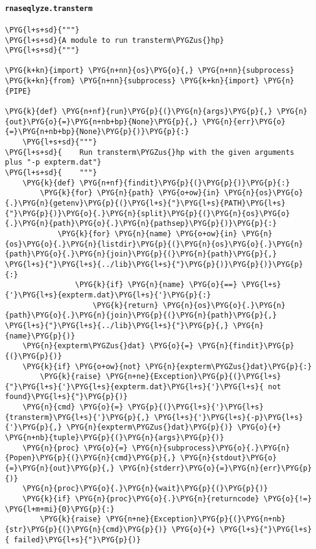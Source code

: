 \paragraph{\texttt{rnaseqlyze.transterm}}
\label{index-pdf4:rnaseqlyze-transterm}
\begin{Verbatim}[commandchars=\\\{\}]
\PYG{l+s+sd}{"""}
\PYG{l+s+sd}{A module to run transterm\PYGZus{}hp}
\PYG{l+s+sd}{"""}

\PYG{k+kn}{import} \PYG{n+nn}{os}\PYG{o}{,} \PYG{n+nn}{subprocess}
\PYG{k+kn}{from} \PYG{n+nn}{subprocess} \PYG{k+kn}{import} \PYG{n}{PIPE}

\PYG{k}{def} \PYG{n+nf}{run}\PYG{p}{(}\PYG{n}{args}\PYG{p}{,} \PYG{n}{out}\PYG{o}{=}\PYG{n+nb+bp}{None}\PYG{p}{,} \PYG{n}{err}\PYG{o}{=}\PYG{n+nb+bp}{None}\PYG{p}{)}\PYG{p}{:}
    \PYG{l+s+sd}{"""}
\PYG{l+s+sd}{    Run transterm\PYGZus{}hp with the given arguments plus "-p expterm.dat"}
\PYG{l+s+sd}{    """}
    \PYG{k}{def} \PYG{n+nf}{findit}\PYG{p}{(}\PYG{p}{)}\PYG{p}{:}
        \PYG{k}{for} \PYG{n}{path} \PYG{o+ow}{in} \PYG{n}{os}\PYG{o}{.}\PYG{n}{getenv}\PYG{p}{(}\PYG{l+s}{"}\PYG{l+s}{PATH}\PYG{l+s}{"}\PYG{p}{)}\PYG{o}{.}\PYG{n}{split}\PYG{p}{(}\PYG{n}{os}\PYG{o}{.}\PYG{n}{path}\PYG{o}{.}\PYG{n}{pathsep}\PYG{p}{)}\PYG{p}{:}
            \PYG{k}{for} \PYG{n}{name} \PYG{o+ow}{in} \PYG{n}{os}\PYG{o}{.}\PYG{n}{listdir}\PYG{p}{(}\PYG{n}{os}\PYG{o}{.}\PYG{n}{path}\PYG{o}{.}\PYG{n}{join}\PYG{p}{(}\PYG{n}{path}\PYG{p}{,} \PYG{l+s}{"}\PYG{l+s}{../lib}\PYG{l+s}{"}\PYG{p}{)}\PYG{p}{)}\PYG{p}{:}
                \PYG{k}{if} \PYG{n}{name} \PYG{o}{==} \PYG{l+s}{'}\PYG{l+s}{expterm.dat}\PYG{l+s}{'}\PYG{p}{:}
                    \PYG{k}{return} \PYG{n}{os}\PYG{o}{.}\PYG{n}{path}\PYG{o}{.}\PYG{n}{join}\PYG{p}{(}\PYG{n}{path}\PYG{p}{,} \PYG{l+s}{"}\PYG{l+s}{../lib}\PYG{l+s}{"}\PYG{p}{,} \PYG{n}{name}\PYG{p}{)}
    \PYG{n}{expterm\PYGZus{}dat} \PYG{o}{=} \PYG{n}{findit}\PYG{p}{(}\PYG{p}{)}
    \PYG{k}{if} \PYG{o+ow}{not} \PYG{n}{expterm\PYGZus{}dat}\PYG{p}{:}
        \PYG{k}{raise} \PYG{n+ne}{Exception}\PYG{p}{(}\PYG{l+s}{"}\PYG{l+s}{'}\PYG{l+s}{expterm.dat}\PYG{l+s}{'}\PYG{l+s}{ not found}\PYG{l+s}{"}\PYG{p}{)}
    \PYG{n}{cmd} \PYG{o}{=} \PYG{p}{(}\PYG{l+s}{'}\PYG{l+s}{transterm}\PYG{l+s}{'}\PYG{p}{,} \PYG{l+s}{'}\PYG{l+s}{-p}\PYG{l+s}{'}\PYG{p}{,} \PYG{n}{expterm\PYGZus{}dat}\PYG{p}{)} \PYG{o}{+} \PYG{n+nb}{tuple}\PYG{p}{(}\PYG{n}{args}\PYG{p}{)}
    \PYG{n}{proc} \PYG{o}{=} \PYG{n}{subprocess}\PYG{o}{.}\PYG{n}{Popen}\PYG{p}{(}\PYG{n}{cmd}\PYG{p}{,} \PYG{n}{stdout}\PYG{o}{=}\PYG{n}{out}\PYG{p}{,} \PYG{n}{stderr}\PYG{o}{=}\PYG{n}{err}\PYG{p}{)}
    \PYG{n}{proc}\PYG{o}{.}\PYG{n}{wait}\PYG{p}{(}\PYG{p}{)}
    \PYG{k}{if} \PYG{n}{proc}\PYG{o}{.}\PYG{n}{returncode} \PYG{o}{!=} \PYG{l+m+mi}{0}\PYG{p}{:}
        \PYG{k}{raise} \PYG{n+ne}{Exception}\PYG{p}{(}\PYG{n+nb}{str}\PYG{p}{(}\PYG{n}{cmd}\PYG{p}{)} \PYG{o}{+} \PYG{l+s}{"}\PYG{l+s}{ failed}\PYG{l+s}{"}\PYG{p}{)}


\end{Verbatim}
